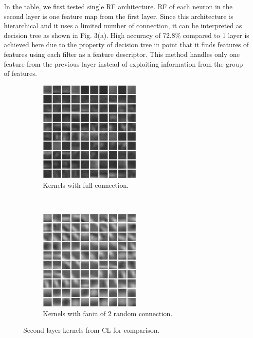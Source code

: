 \documentclass{article} %
\begin{document}
In the table, we first tested single RF architecture.
RF of each neuron in the second layer is one feature map from the first layer.
Since this architecture is hierarchical and it uses a limited number of connection, it can be interpreted as decision tree as shown in Fig. 3(a).
High accuracy of 72.8\% compared to 1 layer is achieved here due to the property of decision tree in point that it finds
features of features using each filter as a feature descriptor.
This method handles only one feature from the previous layer instead of exploiting information from the group of features.

\begin{figure}
        \centering
        \label{fig-secondkernels}
        \begin{subfigure}[b]{0.5\textwidth}
                \centering
                \includegraphics[width=2.0in]{fig-kernels2-full.eps}
                \caption{Kernels with full connection.}
        \end{subfigure}%
        ~%
        \begin{subfigure}[b]{0.5\textwidth}
                \centering
                \includegraphics[width=2.0in]{fig-kernels2-random.eps}
                \caption{Kernels with fanin of 2 random connection.}
        \end{subfigure}
        \caption{Second layer kernels from CL for comparison.}
\end{figure}
\end{document}
